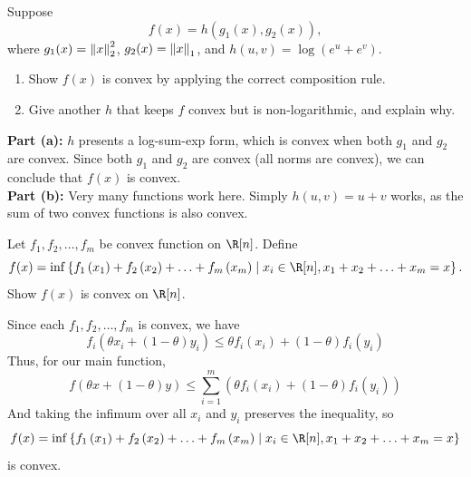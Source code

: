 \documentclass[11pt]{article}
\begin{document}
\begin{homeworkProblem}
    Suppose
    \[
        f(x) = h(g_1(x),g_2(x)),
    \]
    where $g_1(x) = \norm{x}_2^2$, $g_2(x) = \norm{x}_1$, and $h(u, v) = \log(e^u + e^v)$.
    \begin{enumerate}[label=(\alph*), topsep=5pt, itemsep=2.5pt]
        \item Show $f(x)$ is convex by applying the correct composition rule.
        \item Give another $h$ that keeps $f$ convex but is non-logarithmic, and explain why.
    \end{enumerate} \vspace{1\baselineskip}

    \solution

    \textbf{Part (a):} $h$ presents a log-sum-exp form, which is convex when both $g_1$ and $g_2$ are convex.
    Since both $g_1$ and $g_2$ are convex (all norms are convex), we can conclude that $f(x)$ is convex. \\

    \textbf{Part (b):} Very many functions work here. Simply $h(u, v) = u + v$ works, as the sum of two convex functions is also convex.

\end{homeworkProblem}

\pagebreak

\begin{homeworkProblem}
    Let $f_1, f_2, \dots, f_m$ be convex function on $\R[n]$. Define
    \[
        f(x)=\inf \left\{f_1\left(x_1\right)+f_2\left(x_2\right)+\ldots+f_m\left(x_m\right) \mid x_i \in \R[n], x_1+x_2+\ldots+x_m=x\right\} .
    \]
    Show $f(x)$ is convex on $\R[n]$. \\

    \solution

    Since each $f_1, f_2, \dots, f_m$ is convex, we have
    \[
        f_i \left(\theta x_i + (1-\theta) y_i\right) \leq \theta f_i(x_i) + (1-\theta) f_i(y_i)
    \]
    Thus, for our main function,
    \[
        f(\theta x + (1-\theta) y) \leq \sum_{i=1}^{m} \left(\theta f_i(x_i) + (1-\theta) f_i(y_i)\right)
    \]
    And taking the infimum over all $x_i$ and $y_i$ preserves the inequality, so
    \[
        f(x) = \inf \left\{f_1\left(x_1\right)+f_2\left(x_2\right)+\ldots+f_m\left(x_m\right) \mid x_i \in \R[n], x_1+x_2+\ldots+x_m=x\right\}
    \]
    is convex.

\end{homeworkProblem}
\end{document}
